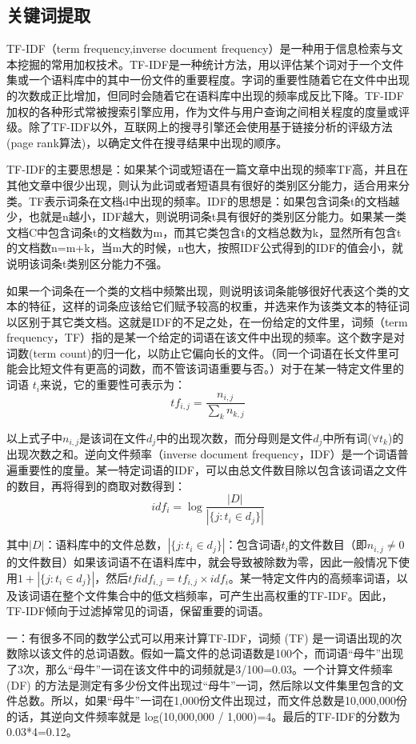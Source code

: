 \subsection{关键词提取}
\par TF-IDF（term frequency,inverse document frequency）是一种用于信息检索与文本挖掘的常用加权技术。TF-IDF是一种统计方法，用以评估某个词对于一个文件集或一个语料库中的其中一份文件的重要程度。字词的重要性随着它在文件中出现的次数成正比增加，但同时会随着它在语料库中出现的频率成反比下降。TF-IDF加权的各种形式常被搜索引擎应用，作为文件与用户查询之间相关程度的度量或评级。除了TF-IDF以外，互联网上的搜寻引擎还会使用基于链接分析的评级方法(page rank算法)，以确定文件在搜寻结果中出现的顺序。
\par TF-IDF的主要思想是：如果某个词或短语在一篇文章中出现的频率TF高，并且在其他文章中很少出现，则认为此词或者短语具有很好的类别区分能力，适合用来分类。TF表示词条在文档d中出现的频率。IDF的思想是：如果包含词条t的文档越少，也就是n越小，IDF越大，则说明词条t具有很好的类别区分能力。如果某一类文档C中包含词条t的文档数为m，而其它类包含t的文档总数为k，显然所有包含t的文档数n=m+k，当m大的时候，n也大，按照IDF公式得到的IDF的值会小，就说明该词条t类别区分能力不强。
\par 如果一个词条在一个类的文档中频繁出现，则说明该词条能够很好代表这个类的文本的特征，这样的词条应该给它们赋予较高的权重，并选来作为该类文本的特征词以区别于其它类文档。这就是IDF的不足之处，在一份给定的文件里，词频（term frequency，TF）指的是某一个给定的词语在该文件中出现的频率。这个数字是对词数(term count)的归一化，以防止它偏向长的文件。（同一个词语在长文件里可能会比短文件有更高的词数，而不管该词语重要与否。）对于在某一特定文件里的词语 $t_i$来说，它的重要性可表示为：
$$tf_{i,j} = \frac{n_{i,j}}{\sum_k n_{k,j}}$$
\par 以上式子中$n_{i,j}$是该词在文件$d_j$中的出现次数，而分母则是文件$d_j$中所有词($\forall t_k$)的出现次数之和。逆向文件频率（inverse document frequency，IDF）是一个词语普遍重要性的度量。某一特定词语的IDF，可以由总文件数目除以包含该词语之文件的数目，再将得到的商取对数得到：
$$idf_i = \log\frac{|D|}{|\{j: t_{i} \in d_{j}\}|}$$
\par 其中$|D|$：语料库中的文件总数，$|\{j: t_{i} \in d_{j}\}|$：包含词语$t_i$的文件数目（即$n_{i,j} \neq 0$的文件数目）如果该词语不在语料库中，就会导致被除数为零，因此一般情况下使用$1 + |\{j : t_i \in d_j\}|$，然后$tfidf_{i,j} = tf_{i,j} \times idf_{i}$。某一特定文件内的高频率词语，以及该词语在整个文件集合中的低文档频率，可产生出高权重的TF-IDF。因此，TF-IDF倾向于过滤掉常见的词语，保留重要的词语。
\par 一：有很多不同的数学公式可以用来计算TF-IDF，词频 (TF) 是一词语出现的次数除以该文件的总词语数。假如一篇文件的总词语数是100个，而词语“母牛”出现了3次，那么“母牛”一词在该文件中的词频就是3/100=0.03。一个计算文件频率 (DF) 的方法是测定有多少份文件出现过“母牛”一词，然后除以文件集里包含的文件总数。所以，如果“母牛”一词在1,000份文件出现过，而文件总数是10,000,000份的话，其逆向文件频率就是 log(10,000,000 / 1,000)=4。最后的TF-IDF的分数为0.03*4=0.12。
